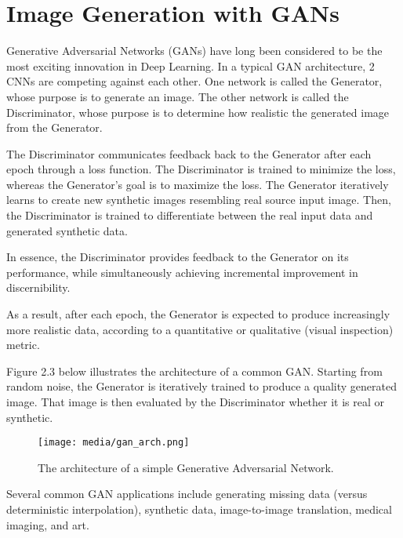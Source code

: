 \section{Image Generation with GANs}

Generative Adversarial Networks (GANs) have long been considered to be 
the most exciting innovation in Deep Learning. In a typical GAN architecture, 
2 CNNs are competing against each other. One network is called the Generator, whose purpose is to 
generate an image. The other network is called the Discriminator, whose purpose is to determine 
how realistic the generated image from the Generator. 

The Discriminator communicates feedback back to the Generator after each epoch through a loss function.
The Discriminator is trained to minimize the loss, whereas the Generator's goal is to maximize the loss. 
The Generator iteratively learns to create new synthetic images resembling real source input image.
Then, the Discriminator is trained to differentiate between the real input data and generated synthetic data. \citep{GANs} 


In essence, the Discriminator provides feedback to the Generator on its performance, while 
simultaneously achieving incremental improvement in discernibility. 

As a result, after each epoch, the Generator is expected to produce increasingly more realistic data,
according to a quantitative or qualitative (visual inspection) metric.

\vspace{5mm}

Figure 2.3 below illustrates the architecture of a common GAN. Starting from random noise,
the Generator is iteratively trained to produce a quality generated image.
That image is then evaluated by the Discriminator whether it is real or synthetic.

\begin{figure}[H]
	\begin{center}
	\texttt{[image: media/gan\_arch.png]}
	\end{center}
	\caption[GAN Architecture]{The architecture of a simple
    Generative Adversarial Network. \citep{GANs}}
	\end{figure}

Several common GAN applications include generating missing data (versus deterministic
interpolation), synthetic data, image-to-image translation, medical imaging, and art.


